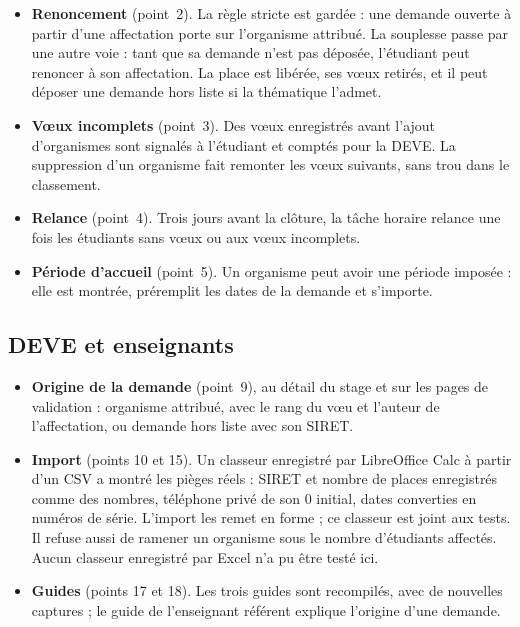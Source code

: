 \documentclass[11pt,a4paper]{article}
\begin{document}
\begin{itemize}
  \item \textbf{Renoncement} (point~2). La règle stricte est gardée : une demande ouverte à partir
    d'une affectation porte sur l'organisme attribué. La souplesse passe par une autre voie :
    tant que sa demande n'est pas déposée, l'étudiant peut renoncer à son affectation. La place
    est libérée, ses vœux retirés, et il peut déposer une demande hors liste si la thématique
    l'admet.
  \item \textbf{Vœux incomplets} (point~3). Des vœux enregistrés avant l'ajout d'organismes sont
    signalés à l'étudiant et comptés pour la DEVE. La suppression d'un organisme fait remonter les
    vœux suivants, sans trou dans le classement.
  \item \textbf{Relance} (point~4). Trois jours avant la clôture, la tâche horaire relance une fois
    les étudiants sans vœux ou aux vœux incomplets.
  \item \textbf{Période d'accueil} (point~5). Un organisme peut avoir une période imposée : elle est
    montrée, préremplit les dates de la demande et s'importe.
\end{itemize}

\subsection{DEVE et enseignants}

\begin{itemize}
  \item \textbf{Origine de la demande} (point~9), au détail du stage et sur les pages de
    validation : organisme attribué, avec le rang du vœu et l'auteur de l'affectation, ou demande
    hors liste avec son SIRET.
  \item \textbf{Import} (points 10 et 15). Un classeur enregistré par LibreOffice Calc à partir d'un
    CSV a montré les pièges réels : SIRET et nombre de places enregistrés comme des nombres,
    téléphone privé de son 0 initial, dates converties en numéros de série. L'import les remet en
    forme ; ce classeur est joint aux tests. Il refuse aussi de ramener un organisme sous le nombre
    d'étudiants affectés. Aucun classeur enregistré par Excel n'a pu être testé ici.
  \item \textbf{Guides} (points 17 et 18). Les trois guides sont recompilés, avec de nouvelles
    captures ; le guide de l'enseignant référent explique l'origine d'une demande.
\end{itemize}
\end{document}
